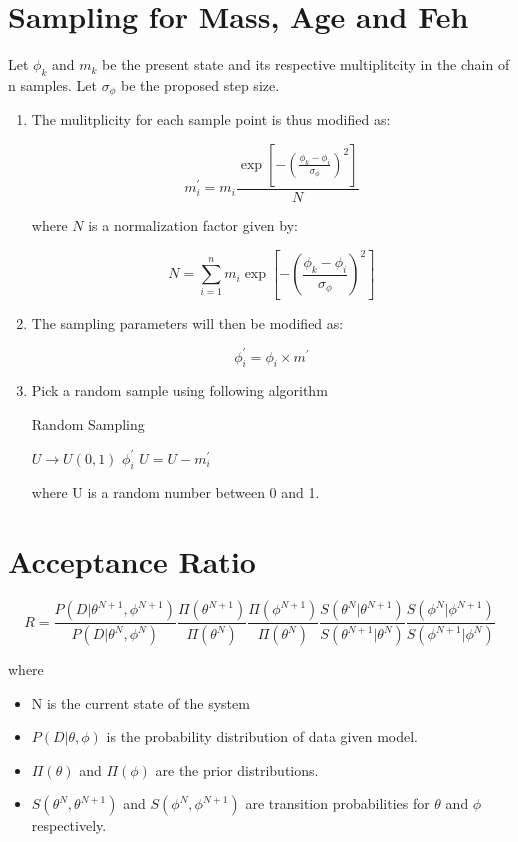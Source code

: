 \documentclass{article}
\begin{document}
\section{Sampling for Mass, Age and Feh}

Let $\phi_k$ and $m_k$ be the present state and its respective multiplitcity in the chain of n samples. Let $\sigma_{\phi}$ be the proposed step size.

\begin{enumerate}
\item The mulitplicity for each sample point is thus modified as:

$$m_i^{\prime} = m_i  \dfrac{\exp \left[ -\left(\frac{\phi_k - \phi_i}{\sigma_{\phi}}\right)^2 \right]}{N}$$

where $N$ is a normalization factor given by:

$$N = \sum_{i=1}^n m_i  \exp \left[ -\left(\frac{\phi_k - \phi_i}{\sigma_{\phi}}\right)^2 \right]$$

\item The sampling parameters will then be modified as:

$$\phi_i^{\prime} = \phi_i \times m^{\prime}$$

\item Pick a random sample using following algorithm
\begin{algorithm}
\caption{Random Sampling}
\begin{algorithmic}
\STATE $U \rightarrow U(0,1)$
		\RETURN $\phi_i^{\prime}$
	\ELSE \STATE  $U=U-m_i^{\prime}$
\ENDIF
\ENDFOR

\end{algorithmic}
\end{algorithm}

where U is a random number between 0 and 1.
\end{enumerate}

\newpage
\section{Acceptance Ratio}


$$R= \dfrac{P(D | \theta^{N+1},\phi^{N+1})}{P(D | \theta^{N},\phi^{N})}   \frac{\Pi(\theta^{N+1})}{ \Pi(\theta^{N})}   \frac{\Pi(\phi^{N+1})}{ \Pi(\theta^{N})} \frac{S(\theta^N | \theta^{N+1})}{S(\theta^{N+1} | \theta^{N})} \frac{S(\phi^N | \phi^{N+1})}{S(\phi^{N+1} | \phi^{N})}$$

where
\begin{itemize}
\item N is the current state of the system
\item $P(D | \theta, \phi)$ is the probability distribution of data given model.
\item $\Pi(\theta)$ and $\Pi(\phi)$ are the prior distributions.

\item $S(\theta^N,\theta^{N+1})$ and $S(\phi^N,\phi^{N+1})$  are transition probabilities for $\theta$ and $\phi$ respectively.
\end{itemize}
\end{document}

